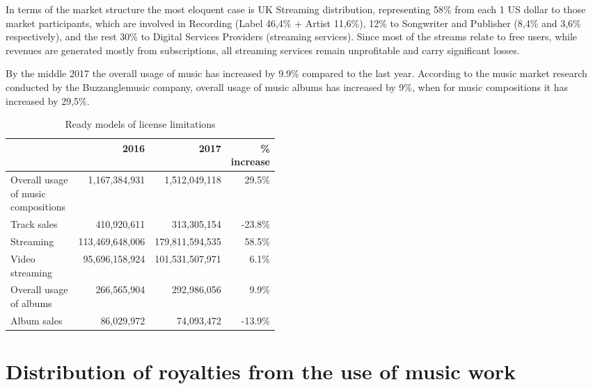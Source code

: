 \documentclass[12pt]{report}
\def\code#1{\colorbox{light-gray}{\texttt{#1}}}
\begin{document}
In terms of the market structure the most eloquent case is UK Streaming distribution, representing 58\% from each 1 US dollar to those market participants, which are involved in Recording (Label 46,4\% + Artist 11,6\%), 12\% to Songwriter and Publisher (8,4\% and 3,6\% respectively), and the rest 30\% to Digital Services Providers (streaming services). Since most of the streams relate to free users, while revenues are generated mostly from subscriptions, all streaming services remain unprofitable and carry significant losses.  
 
By the middle 2017 the overall usage of music has increased by 9.9\% compared to the last year.
According to the music market research conducted by the Buzzanglemusic company, overall usage of music albums has increased by 9\%, when for music compositions it has increased by 29,5\%.


\def\Prev{2016}
\def\Current{2017}
\def\Grow{\% increase}
\def\Summary{Overall usage of music compositions}
\def\Sales{Track sales}
\def\Streaming{Streaming}
\def\VideoStreaming{Video streaming}
\def\Albums{Overall usage of albums}
\def\AlbumsSales{Album sales}

\begin{table}[H]
\centering
\caption{Ready models of license limitations}
\begin{tabular}{p{0.45\linewidth}rrr}%
\toprule
& \Prev & \Current & \Grow \\
\toprule
\midrule
\Summary 			& 1,167,384,931 		& 1,512,049,118 		& 29.5\% \\
\Sales 					& 410,920,611 			& 313,305,154 			& -23.8\% \\
\Streaming 			& 113,469,648,006 	& 179,811,594,535 	& 58.5\% \\
\VideoStreaming 	& 95,696,158,924 	& 101,531,507,971		& 6.1\% \\
\Albums 				& 266,565,904 		& 292,986,056 		& 9.9\% \\
\AlbumsSales 		& 86,029,972 			& 74,093,472	 		& -13.9\% \\
\bottomrule
\end{tabular}
\end{table}

\vfill\null\pagebreak
\section{Distribution of royalties from the use of music work}
\label{industry-distribution}
\end{document}
